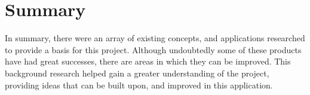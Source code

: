 \section{Summary}

In summary, there were an array of existing concepts, and applications researched to provide a basis for this project. Although undoubtedly some of these products have had great successes, there are areas in which they can be improved. This background research helped gain a greater understanding of the project, providing ideas that can be built upon, and improved in this application.